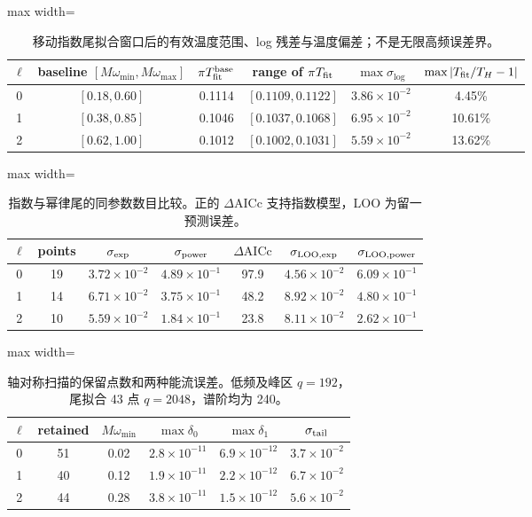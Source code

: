\begin{table}[htbp]
\centering
\caption{移动指数尾拟合窗口后的有效温度范围、log 残差与温度偏差；不是无限高频误差界。}
\label{note-tab:tail-window}
\begin{adjustbox}{max width=\textwidth}
\begin{tabular}{c c c c c c}
$\ell$ & baseline $[M\omega_{\min},M\omega_{\max}]$
& $\pi T_{\rm fit}^{\rm base}$ & range of $\pi T_{\rm fit}$
& $\max\sigma_{\log}$ & $\max|T_{\rm fit}/T_H-1|$\\
\hline
0 & $[0.18,0.60]$ & 0.1114 & $[0.1109,0.1122]$ & $3.86\times10^{-2}$ & 4.45\%\\
1 & $[0.38,0.85]$ & 0.1046 & $[0.1037,0.1068]$ & $6.95\times10^{-2}$ & 10.61\%\\
2 & $[0.62,1.00]$ & 0.1012 & $[0.1002,0.1031]$ & $5.59\times10^{-2}$ & 13.62\%\\
\end{tabular}
\end{adjustbox}
\end{table}

\begin{table}[htbp]
\centering
\caption{指数与幂律尾的同参数数目比较。正的 $\Delta\mathrm{AICc}$ 支持指数模型，LOO 为留一预测误差。}
\label{note-tab:tail-models}
\begin{adjustbox}{max width=\textwidth}
\begin{tabular}{c c c c c c c}
$\ell$ & points & $\sigma_{\rm exp}$ & $\sigma_{\rm power}$
& $\Delta\mathrm{AICc}$ & $\sigma_{\rm LOO,exp}$ & $\sigma_{\rm LOO,power}$\\
\hline
0 & 19 & $3.72\times10^{-2}$ & $4.89\times10^{-1}$ & 97.9 & $4.56\times10^{-2}$ & $6.09\times10^{-1}$\\
1 & 14 & $6.71\times10^{-2}$ & $3.75\times10^{-1}$ & 48.2 & $8.92\times10^{-2}$ & $4.80\times10^{-1}$\\
2 & 10 & $5.59\times10^{-2}$ & $1.84\times10^{-1}$ & 23.8 & $8.11\times10^{-2}$ & $2.62\times10^{-1}$\\
\end{tabular}
\end{adjustbox}
\end{table}

\begin{table}[htbp]
\centering
\caption{轴对称扫描的保留点数和两种能流误差。低频及峰区 $q=192$，尾拟合 43 点 $q=2048$，谱阶均为 240。}
\label{note-tab:numerics}
\begin{adjustbox}{max width=\textwidth}
\begin{tabular}{c c c c c c}
$\ell$ & retained & $M\omega_{\min}$ & $\max\delta_0$ & $\max\delta_1$
& $\sigma_{\rm tail}$\\
\hline
0 & 51 & 0.02 & $2.8\times10^{-11}$ & $6.9\times10^{-12}$ & $3.7\times10^{-2}$\\
1 & 40 & 0.12 & $1.9\times10^{-11}$ & $2.2\times10^{-12}$ & $6.7\times10^{-2}$\\
2 & 44 & 0.28 & $3.8\times10^{-11}$ & $1.5\times10^{-12}$ & $5.6\times10^{-2}$\\
\end{tabular}
\end{adjustbox}
\end{table}

